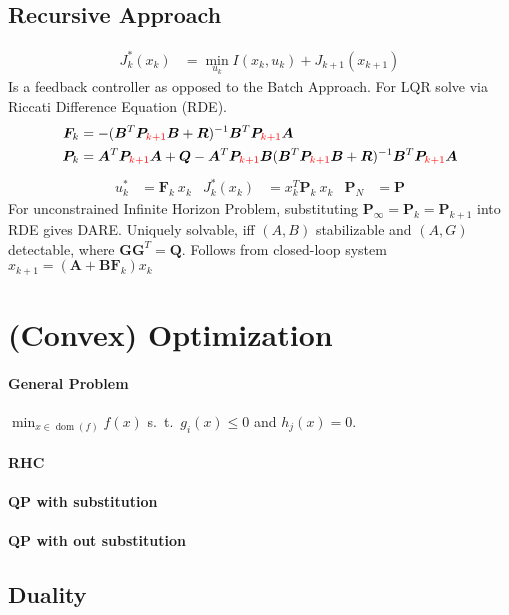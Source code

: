\documentclass[landscape,a4paper,8pt]{scrartcl}
\newcommand{\remph}[1]{{\textcolor{red}{#1}}}
\newcommand\vA{\bm{A}}
\newcommand\vB{\bm{B}}
\newcommand\vF{\bm{F}}
\newcommand\vG{\bm{G}}
\newcommand\vP{\bm{P}}
\newcommand\vQ{\bm{Q}}
\newcommand\vR{\bm{R}}
\DeclareMathOperator\dom{dom}
\begin{document}
\begin{multicols*}{3}
\subsection{Recursive Approach}
\begin{align*}
J_k^*(x_k) & = \min_{u_k} I(x_k, u_k) + J_{k+1}(x_{k+1})
\end{align*}
Is a feedback controller as opposed to the Batch Approach.
For LQR solve via Riccati Difference Equation (RDE).
\begin{align*}
 \vF_k & = -(\vB^T\vP_\remph{k+1}\vB + \vR)^{-1}\vB^T\vP_\remph{k+1}\vA \\
 \vP_k & = \vA^T\vP_\remph{k+1}\vA + \vQ - \vA^T\vP_\remph{k+1}\vB(\vB^T\vP_\remph{k+1}\vB + \vR)^{-1}\vB^T\vP_\remph{k+1}\vA
\end{align*}
\begin{align*}
 u_k^* & = \vF_k\ x_k  & J_k^*(x_k) & = x_k^T\vP_k\ x_k & \vP_N & = \vP
\end{align*}
For unconstrained Infinite Horizon Problem, substituting $\vP_\infty = \vP_k = \vP_{k+1}$ into RDE gives DARE.
Uniquely solvable, iff $(A,B)$ stabilizable and $(A, G)$ detectable, where $\vG\vG^T = \vQ$.
Follows from closed-loop system $x_{k+1} = (\vA + \vB\vF_k)x_k$

\section{(Convex) Optimization}

\paragraph{General Problem}
$\min_{x \in \dom(f)} f(x)$ s.\ t.\ $g_i(x) \leq 0$ and $h_j(x) = 0.$

\paragraph{RHC}
\paragraph{QP with substitution}
\paragraph{QP with out substitution}

\subsection{Duality}

\end{multicols*}
\end{document}
